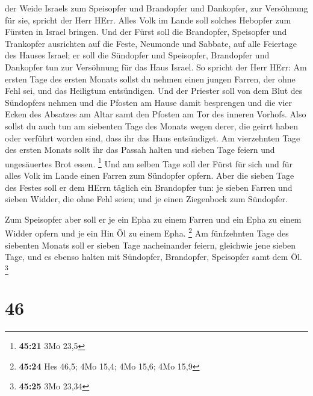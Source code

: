 der Weide Israels zum Speisopfer und Brandopfer und Dankopfer, zur
Versöhnung für sie, spricht der Herr HErr.  Alles Volk im
Lande soll solches Hebopfer zum Fürsten in Israel bringen. 
Und der Fürst soll die Brandopfer, Speisopfer und Trankopfer ausrichten
auf die Feste, Neumonde und Sabbate, auf alle Feiertage des Hauses
Israel; er soll die Sündopfer und Speisopfer, Brandopfer und Dankopfer
tun zur Versöhnung für das Haus Israel.  So spricht der
Herr HErr: Am ersten Tage des ersten Monats sollst du nehmen einen
jungen Farren, der ohne Fehl sei, und das Heiligtum entsündigen.
 Und der Priester soll von dem Blut des Sündopfers nehmen
und die Pfosten am Hause damit besprengen und die vier Ecken des
Absatzes am Altar samt den Pfosten am Tor des inneren Vorhofs.
 Also sollst du auch tun am siebenten Tage des Monats wegen
derer, die geirrt haben oder verführt worden sind, dass ihr das Haus
entsündiget.  Am vierzehnten Tage des ersten Monats sollt
ihr das Passah halten und sieben Tage feiern und ungesäuertes Brot
essen. \footnote{\textbf{45:21} 3Mo 23,5}  Und am selben
Tage soll der Fürst für sich und für alles Volk im Lande einen Farren
zum Sündopfer opfern.  Aber die sieben Tage des Festes soll
er dem HErrn täglich ein Brandopfer tun: je sieben Farren und sieben
Widder, die ohne Fehl seien; und je einen Ziegenbock zum Sündopfer.

 Zum Speisopfer aber soll er je ein Epha zu einem Farren
und ein Epha zu einem Widder opfern und je ein Hin Öl zu einem Epha.
\footnote{\textbf{45:24} Hes 46,5; 4Mo 15,4; 4Mo 15,6; 4Mo 15,9}
 Am fünfzehnten Tage des siebenten Monats soll er sieben
Tage nacheinander feiern, gleichwie jene sieben Tage, und es ebenso
halten mit Sündopfer, Brandopfer, Speisopfer samt dem Öl. \footnote{\textbf{45:25}
  3Mo 23,34}

\hypertarget{section-14}{%
\section{46}\label{section-14}}

